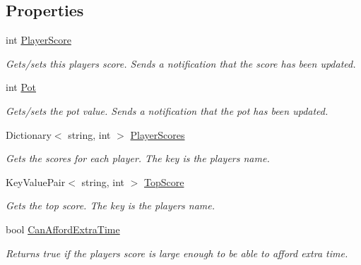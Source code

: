 \subsection*{Properties}
\begin{DoxyCompactItemize}
\item 
int \hyperlink{class_score_manager_a1a7ae6889437a8e47fac4ca2036149b3}{Player\+Score}
\begin{DoxyCompactList}\small\item\em Gets/sets this player\textquotesingle{}s score. Sends a notification that the score has been updated. \end{DoxyCompactList}\item 
int \hyperlink{class_score_manager_a4e64c104c582dbe98703bfaa2a6bf196}{Pot}
\begin{DoxyCompactList}\small\item\em Gets/sets the pot value. Sends a notification that the pot has been updated. \end{DoxyCompactList}\item 
Dictionary$<$ string, int $>$ \hyperlink{class_score_manager_a160ee3a7dbcadcca8a0c623719394681}{Player\+Scores}
\begin{DoxyCompactList}\small\item\em Gets the scores for each player. The key is the player\textquotesingle{}s name. \end{DoxyCompactList}\item 
Key\+Value\+Pair$<$ string, int $>$ \hyperlink{class_score_manager_aea653edd704e7a996e77ac55f23a9782}{Top\+Score}
\begin{DoxyCompactList}\small\item\em Gets the top score. The key is the player\textquotesingle{}s name. \end{DoxyCompactList}\item 
bool \hyperlink{class_score_manager_a45b9f26bc13807ae1733feea8a5c7349}{Can\+Afford\+Extra\+Time}
\begin{DoxyCompactList}\small\item\em Returns true if the player\textquotesingle{}s score is large enough to be able to afford extra time. \end{DoxyCompactList}\end{DoxyCompactItemize}


